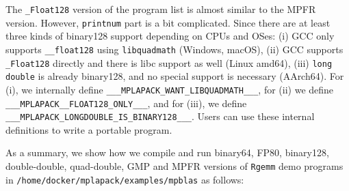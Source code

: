 \documentclass[12pt]{article}
\begin{document}
The {\tt \_Float128} version of the program list is almost similar to the MPFR version. However, {\tt printnum} part is a bit complicated. Since there are at least three kinds of binary128 support depending on CPUs and OSes: (i) GCC only supports {\tt \_\_float128} using {\tt libquadmath} (Windows, macOS), (ii) GCC supports {\tt \_Float128} directly and there is libc support as well (Linux amd64), (iii) {\tt long double} is already binary128, and no special support is necessary (AArch64). For (i), we internally define {\tt \_\_\_MPLAPACK\_WANT\_LIBQUADMATH\_\_\_}, for (ii) we define {\tt \_\_\_MPLAPACK\_\_FLOAT128\_ONLY\_\_\_}, and for (iii),
we define {\tt \_\_\_MPLAPACK\_LONGDOUBLE\_IS\_BINARY128\_\_\_}. Users can use these internal definitions to write a portable program.

As a summary, we show how we compile and run binary64, FP80, binary128, double-double, quad-double, GMP and MPFR versions of {\tt Rgemm} demo programs in {\tt /home/docker/mplapack/examples/mpblas} as follows:
\end{document}
